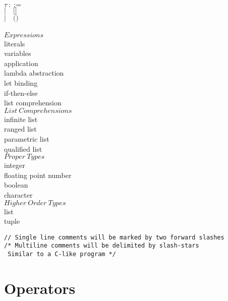 ﻿\documentclass[5pt]{article}
\begin{document}
\begin{multicols}{2}
\noindent $\tau \ ::= $ \\
\hspace*{10mm} $| \quad \texttt{[]} $ \\
\hspace*{10mm} $| \quad \texttt{()} $ \\
\columnbreak \\
$Expressions$ \\
literals \\
variables \\
application \\
lambda abstraction \\
let binding \\
if-then-else \\
list comprehension \\

\noindent $List \ Comprehensions$ \\
infinite list \\
ranged list \\
parametric list \\
qualified list \\

\noindent $Proper \ Types$ \\
integer \\
floating point number \\
boolean \\
character \\

\noindent $Higher \ Order \ Types$ \\
list \\
tuple \\
\end{multicols}

\noindent \texttt{// Single line comments will be marked by two forward slashes} \\

\noindent \texttt{/* Multiline comments will be delimited by slash-stars} \\
\texttt{ \hspace*{3mm} Similar to a C-like program */} \\

\newpage 

\section{Operators}
\end{document}
